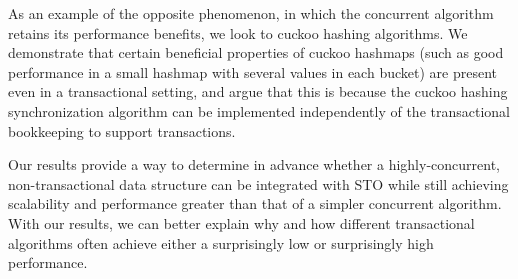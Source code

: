 As an example of the opposite phenomenon, in which the concurrent algorithm retains its performance benefits, we look to cuckoo hashing algorithms. We demonstrate that certain beneficial properties of cuckoo hashmaps (such as good performance in a small hashmap with several values in each bucket) are present even in a transactional setting, and argue that this is because the cuckoo hashing synchronization algorithm can be implemented independently of the transactional bookkeeping to support transactions.

Our results provide a way to determine in advance whether a highly-concurrent, non-transactional data structure can be integrated with STO while still achieving scalability and performance greater than that of a simpler concurrent algorithm. With our results, we can better explain why and how different transactional algorithms often achieve either a surprisingly low or surprisingly high performance.
